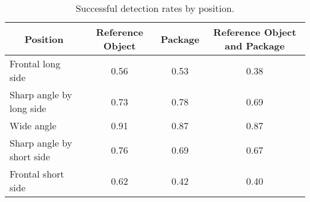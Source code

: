 \begin{table}
\centering
\begin{tabular}{@{} l *3c @{}}
\toprule
 \multicolumn{1}{c}{Position} & Reference Object  & Package  & Reference Object and Package  \\ 
\midrule
 Frontal long side 			& 0.56 & 0.53 & 0.38 \\ 
 Sharp angle by long side  	& 0.73 & 0.78 & 0.69 \\
 Wide angle 				& 0.91 & 0.87 & 0.87 \\
 Sharp angle by short side 	& 0.76 & 0.69 & 0.67 \\
 Frontal short side 		& 0.62 & 0.42 & 0.40 \\
\bottomrule
 \end{tabular}
 \caption{Successful detection rates by position.}
\label{table:detection_by_position}
\end{table}